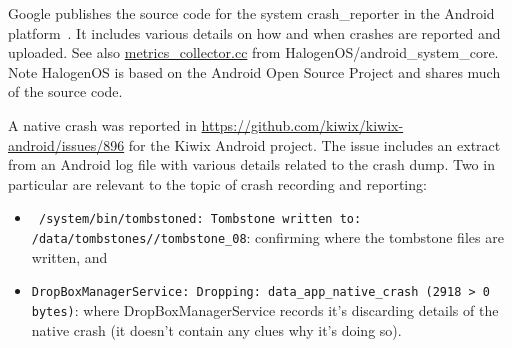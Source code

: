 \begin{itemize}
    Google publishes the source code for the system crash\_reporter in the Android platform~\citep{android_platform_system_crash_reporter}. It includes various details on how and when crashes are reported and uploaded. See also \href{https://git.halogenos.org/halogenOS/android\_system\_core/src/commit/33c59358525052c788a2d170d326b8b1cf810dd1/metricsd/metrics_collector.cc}{metrics\_collector.cc} from HalogenOS/android\_system\_core. Note HalogenOS is based on the Android Open Source Project and shares much of the source code.
\end{itemize}

A native crash was reported in \href{Kiwix Android - Issue 896}{https://github.com/kiwix/kiwix-android/issues/896} for the Kiwix Android project. The issue includes an extract from an Android log file with various details related to the crash dump. Two in particular are relevant to the topic of crash recording and reporting: 

\begin{itemize}
    \item \texttt{ /system/bin/tombstoned: Tombstone written to: /data/tombstones//tombstone\_08}: confirming where the tombstone files are written, and
    
    \item \texttt{DropBoxManagerService: Dropping: data\_app\_native\_crash (2918 > 0 bytes)}: where DropBoxManagerService records it's discarding details of the native crash (it doesn't contain any clues why it's doing so).

\end{itemize}

